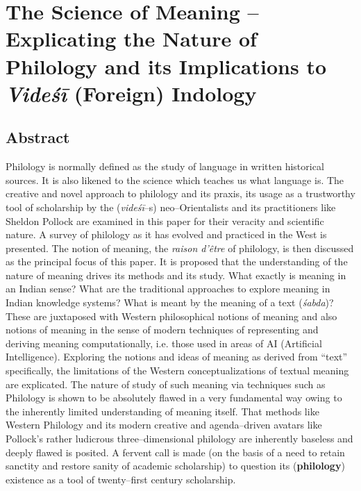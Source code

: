 
\chapter{The Science of Meaning – Explicating the Nature of Philology and its Implications to \textit{Videśī}  (Foreign) Indology}



\section*{Abstract}

Philology is normally defined as the study of language in written historical sources. It is also likened to the science which teaches us what language is. The creative and novel approach to philology and its praxis, its usage as a trustworthy tool of scholarship by the (\textit{videśī}–s) neo–Orientalists and its practitioners like Sheldon Pollock are examined in this paper for their veracity and scientific nature. A survey of philology as it has evolved and practiced in the West is presented. The notion of meaning, the \textit{raison d’être} of philology, is then discussed as the principal focus of this paper. It is proposed that the understanding of the nature of meaning drives its methods and its study. What exactly is meaning in an Indian sense? What are the traditional approaches to explore meaning in Indian knowledge systems? What is meant by the meaning of a text (\textit{śabda})? These are juxtaposed with Western philosophical notions of meaning and also notions of meaning in the sense of modern techniques of representing and deriving meaning computationally, i.e. those used in areas of AI (Artificial Intelligence). Exploring the notions and ideas of meaning as derived from “text” specifically, the limitations of the Western conceptualizations of textual meaning are explicated. The nature of study of such meaning via techniques such as Philology is shown to be absolutely flawed in a very fundamental way owing to the inherently limited understanding of meaning itself. That methods like Western Philology and its modern creative and agenda–driven avatars like Pollock’s rather ludicrous three–dimensional philology are inherently baseless and deeply flawed is posited. A fervent call is made (on the basis of a need to retain sanctity and restore sanity of academic scholarship) to question its (\textbf{philology}) existence as a tool of twenty–first century scholarship.

